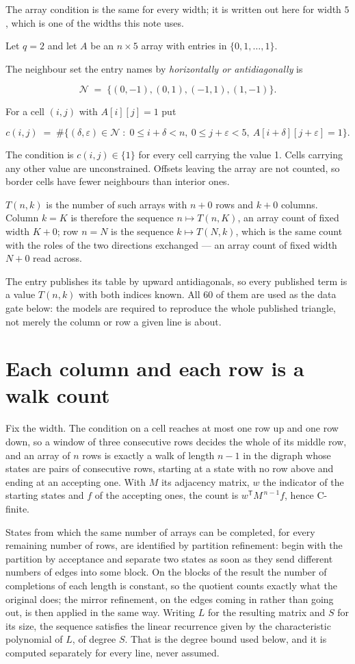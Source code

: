 \documentclass[11pt]{article}
\theoremstyle{definition}
\begin{document}
The array condition is the same for every width; it is written out here for width $5$, which is one of the widths this note uses.

Let $q = 2$ and let $A$ be an $n \times 5$ array with entries in $\{0,1,\dots,1\}$.

The neighbour set the entry names by {\itshape horizontally or antidiagonally} is

\[\mathcal{N} \;=\; \{(0,-1), (0,1), (-1,1), (1,-1)\}.\]

For a cell $(i,j)$ with $A[i][j] = 1$ put

\[c(i,j) \;=\; \#\bigl\{(\delta,\varepsilon)\in\mathcal{N} \;:\; 0\le i+\delta<n,\ 0\le j+\varepsilon<5,\ A[i+\delta][j+\varepsilon] = 1\bigr\}.\]

The condition is $c(i,j) \in \{1\}$ for every cell carrying the value 1. Cells carrying any other value are unconstrained. Offsets leaving the array are not counted, so border cells have fewer neighbours than interior ones.

$T(n,k)$ is the number of such arrays with $n + 0$ rows and $k + 0$ columns. Column $k = K$ is therefore the sequence $n \mapsto T(n,K)$, an array count of fixed width $K + 0$; row $n = N$ is the sequence $k \mapsto T(N,k)$, which is the same count with the roles of the two directions exchanged --- an array count of fixed width $N + 0$ read across.

The entry publishes its table by upward antidiagonals, so every published term is a value $T(n,k)$ with both indices known. All 60 of them are used as the data gate below: the models are required to reproduce the whole published triangle, not merely the column or row a given line is about.

\section{Each column and each row is a walk count}

Fix the width. The condition on a cell reaches at most one row up and one row down, so a window of three consecutive rows decides the whole of its middle row, and an array of $n$ rows is exactly a walk of length $n-1$ in the digraph whose states are pairs of consecutive rows, starting at a state with no row above and ending at an accepting one. With $M$ its adjacency matrix, $w$ the indicator of the starting states and $f$ of the accepting ones, the count is $w^{\mathsf T}M^{\,n-1}f$, hence C-finite.

States from which the same number of arrays can be completed, for every remaining number of rows, are identified by partition refinement: begin with the partition by acceptance and separate two states as soon as they send different numbers of edges into some block. On the blocks of the result the number of completions of each length is constant, so the quotient counts exactly what the original does; the mirror refinement, on the edges coming in rather than going out, is then applied in the same way. Writing $L$ for the resulting matrix and $S$ for its size, the sequence satisfies the linear recurrence given by the characteristic polynomial of $L$, of degree $S$. That is the degree bound used below, and it is computed separately for every line, never assumed.
\end{document}
